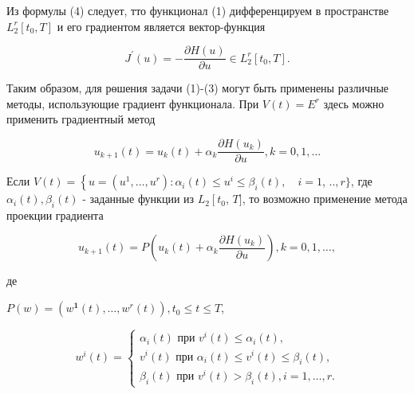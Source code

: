 \documentclass[10pt]{article}
\begin{document}
Из формулы (4) следует, тто функционал (1) дифференцируем в пространстве $L_{2}^{r}\left[t_{0}, T\right]$ и его градиентом является вектор-функция



\[

J^{\prime}(u)=-\frac{\partial H(u)}{\partial u} \in L_{2}^{r}\left[t_{0}, T\right] .

\]



Таким образом, для рөшения задачи (1)-(3) могут быть применены различные методы, использующие градиент функционала. При $V(t)=E^{r}$ здесь можно применить градиентный метод



\[

u_{k+1}(t)=u_{k}(t)+\alpha_{k} \frac{\partial H\left(u_{k}\right)}{\partial u}, k=0,1, \ldots

\]



Если $V(t)=\left\{u=\left(u^{1}, \ldots, u^{r}\right): \alpha_{i}(t) \leqslant u^{i} \leqslant \beta_{i}(t), \quad i=1\right.$, $. ., r\}$, где $\alpha_{i}(t), \beta_{i}(t)$ - заданные функции из $L_{2}\left[t_{0}\right.$, $T]$, то возможно применение метода проекции градиента



\[

u_{k+1}(t)=P\left(u_{k}(t)+\alpha_{k} \frac{\partial H\left(u_{k}\right)}{\partial u}\right), k=0,1, \ldots,

\]



де



$P(w)=\left(w^{\mathbf{1}}(t), \ldots, w^{r}(t)\right), t_{0} \leqslant t \leqslant T$,



\[

w^{i}(t)=\left\{\begin{array}{l}

\alpha_{i}(t) \text { при } v^{i}(t) \leqslant \alpha_{i}(t), \\

v^{i}(t) \text { при } \alpha_{i}(t) \leqslant v^{i}(t) \leqslant \beta_{i}(t), \\

\beta_{i}(t) \text { при } v^{i}(t)>\beta_{i}(t), i=1, \ldots, r .

\end{array}\right.

\]
\end{document}
